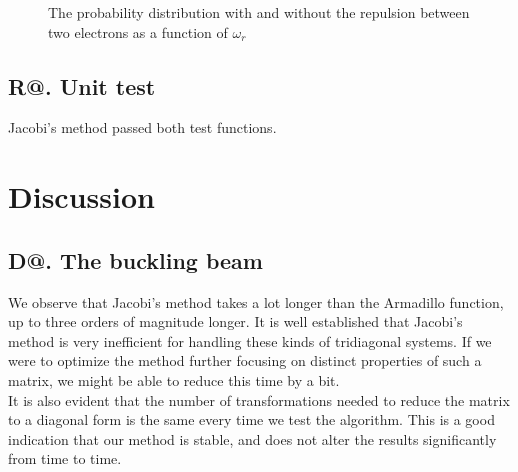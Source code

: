 \documentclass[%
reprint,
amsmath, 
amssymb, 
aps,]{revtex4-1}
\makeatletter
\newcommand*{\rom}[1]{\expandafter\@slowromancap\romannumeral #1@}
\makeatother
\begin{document}
\begin{figure}
\caption{The probability distribution with and without the repulsion between two electrons as a function of $\omega_r$} \label{wavefunc}
			\end{figure}

		\subsection*{R\rom{5}. Unit test}
Jacobi's method passed both test functions.

	\section*{Discussion} 
		\subsection*{D\rom{1}. The buckling beam}
We observe that Jacobi's method takes a lot longer than the Armadillo function, up to three orders of magnitude longer. It is well established that Jacobi's method is very inefficient for handling these kinds of tridiagonal systems. If we were to optimize the method further focusing on distinct properties of such a matrix, we might be able to reduce this time by a bit. \\ \indent 
It is also evident that the number of transformations needed to reduce the matrix to a diagonal form is the same every time we test the algorithm. This is a good indication that our method is stable, and does not alter the results significantly from time to time.  
\end{document}
